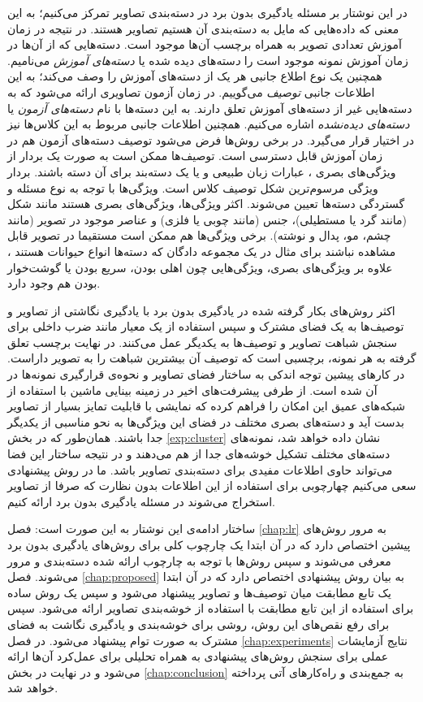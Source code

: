 در این نوشتار بر مسئله یادگیری بدون برد در دسته‌بندی تصاویر تمرکز می‌کنیم؛ به این معنی که داده‌هایی که مایل به دسته‌بندی آن هستیم تصاویر هستند. در نتیجه در زمان آموزش تعدادی تصویر به همراه برچسب آن‌ها موجود است. دسته‌هایی که از آن‌ها در زمان آموزش نمونه موجود است را {\emph دسته‌های دیده شده} یا \emph{ دسته‌های آموزش} می‌نامیم. همچنین یک نوع اطلاع جانبی هر یک از دسته‌های آموزش را وصف می‌کند؛ به این اطلاعات جانبی \emph{ توصیف}  می‌گوییم. در زمان آزمون تصاویری ارائه می‌شود که به دسته‌هایی غیر از دسته‌های آموزش تعلق دارند. به این دسته‌ها با نام\emph{  دسته‌های آزمون}  یا \emph{ دسته‌های دیده‌نشده}  اشاره می‌کنیم. همچنین اطلاعات جانبی مربوط به این کلاس‌ها نیز در اختیار قرار می‌گیرد. در برخی روش‌ها فرض می‌شود توصیف دسته‌های آزمون هم در زمان آموزش قابل دسترسی است. توصیف‌ها ممکن است به صورت یک بردار از ویژگی‌های بصری \cite{farhadi09}،
 عبارات زبان طبیعی
 \cite{ng13, mohamed13, noroz14}
 و یا یک دسته‌بند برای آن دسته  \cite{Yu2013} باشند. بردار ویژگی مرسوم‌ترین شکل توصیف کلاس است. ویژگی‌ها با توجه به نوع مسئله و گستردگی دسته‌ها تعیین می‌شوند. اکثر ویژگی‌ها، ویژگی‌های بصری هستند مانند شکل (مانند گرد یا مستطیلی)، جنس (مانند چوبی یا فلزی) و عناصر موجود در تصویر (مانند چشم، مو، پدال و نوشته). برخی ویژگی‌ها هم ممکن است مستقیما در تصویر قابل مشاهده نباشند برای مثال در یک مجموعه دادگان که دسته‌ها انواع حیوانات هستند
 \cite{lampert09}،
 علاوه بر ویژگی‌های بصری، ویژگی‌هایی چون اهلی بودن، سریع‌ بودن یا گوشت‌خوار بودن هم وجود دارد.

 اکثر روش‌های بکار گرفته شده در یادگیری بدون برد با یادگیری نگاشتی از تصاویر و توصیف‌ها به یک فضای مشترک و سپس استفاده از یک معیار مانند ضرب داخلی برای سنجش شباهت تصاویر و توصیف‌ها به یکدیگر عمل می‌کنند. در نهایت برچسب تعلق گرفته به هر نمونه، برچسبی است که توصیف آن بیشترین شباهت را به تصویر داراست. در کارهای پیشین توجه اندکی به ساختار فضای تصاویر و نحوه‌ی قرارگیری نمونه‌ها در آن شده است. از طرفی پیشرفت‌های اخیر در زمینه بینایی ماشین با استفاده از شبکه‌های عمیق \cite{vgg} این امکان را فراهم کرده که نمایشی با قابلیت تمایز بسیار از تصاویر بدست آید و دسته‌های بصری مختلف در فضای این ویژگی‌ها به نحو مناسبی از یکدیگر جدا باشند. همان‌طور که در بخش \ref{exp:cluster} نشان داده خواهد شد، نمونه‌های دسته‌های مختلف تشکیل خوشه‌های جدا از هم می‌دهند و در نتیجه ساختار این فضا می‌تواند حاوی اطلاعات مفیدی برای دسته‌بندی تصاویر باشد. ما در روش پیشنهادی سعی می‌کنیم چهارچوبی برای استفاده از این اطلاعات بدون نظارت که صرفا از تصاویر استخراج می‌شوند در مسئله یادگیری بدون برد ارائه کنیم.

 ساختار ادامه‌ی این نوشتار به این صورت است:  فصل \ref{chap:lr} به مرور روش‌های پیشین اختصاص دارد که در آن ابتدا یک چارچوب کلی برای روش‌های یادگیری بدون برد معرفی می‌شوند و سپس روش‌ها با توجه به چارچوب ارائه شده دسته‌بندی و مرور می‌شوند. فصل \ref{chap:proposed} به بیان روش پیشنهادی اختصاص دارد که در آن ابتدا یک تابع مطابقت میان توصیف‌ها و تصاویر پیشنهاد می‌شود و سپس یک روش ساده برای استفاده از این تابع مطابقت با استفاده از خوشه‌بندی تصاویر ارائه می‌شود. سپس برای رفع نقص‌های این روش، روشی برای خوشه‌بندی و یادگیری نگاشت به فضای مشترک به صورت توام پیشنهاد می‌شود. در فصل
 \ref{chap:experiments}
نتایج آزمایشات عملی برای سنجش روش‌های پیشنهادی به همراه تحلیلی برای عمل‌کرد آن‌ها ارائه می‌شود و در نهایت در بخش \ref{chap:conclusion} به جمع‌بندی و راه‌کارهای آتی پرداخته خواهد شد.
